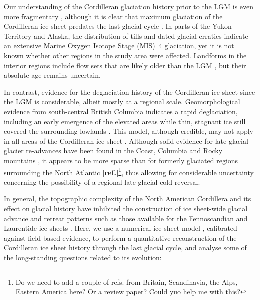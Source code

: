 \documentclass[tc, manuscript]{copernicus}
\newcommand{\aref}[0]{\textbf{[ref.]}}
\begin{document}
Our understanding of the Cordilleran glaciation history prior to the LGM is
even more fragmentary
    \citep{Barendregt.Irving.1998, Kleman.etal.2010, Rutter.etal.2012},
although it is clear that maximum glaciation of the Cordilleran ice sheet
predates the last glacial cycle
    \citep{Hidy.etal.2013}.
In parts of the Yukon Territory and Alaska, the distribution of tills
    \citep{Turner.etal.2013}
and dated glacial erratics
    \citep{Ward.etal.2007, Ward.etal.2008, Briner.Kaufman.2008,
           Stroeven.etal.2010, Stroeven.etal.2014}
indicate an extensive Marine Oxygen Isotope Stage (MIS)~4 glaciation,
yet it is not known whether other regions in the study area were affected.
Landforms in the interior regions include flow sets that are likely
older than the LGM
    \citep[Fig.~2]{Kleman.etal.2010},
but their absolute age remains uncertain.

In contrast, evidence for the deglaciation history of the Cordilleran
ice sheet since the LGM is considerable, albeit mostly at a regional scale.
Geomorphological evidence from south-central British Columbia indicates a rapid
deglaciation, including an early emergence of the elevated areas while thin,
stagnant ice still covered the surrounding lowlands
    \citep{Fulton.1967, Fulton.1991, Margold.etal.2011, Margold.etal.2013a}.
This model, although credible, may not apply in all areas of the Cordilleran
ice sheet
    \citep{Margold.etal.2013}.
Although solid evidence for late-glacial glacier re-advances have been found in
the Coast, Columbia and Rocky mountains
    \citep{Clague.etal.1997, Friele.Clague.2002, Friele.Clague.2002a,
           Kovanen.2002, Kovanen.Easterbrook.2002, Lakeman.etal.2008,
           Menounos.etal.2008},
it appears to be more sparse than for formerly glaciated regions surrounding
the North Atlantic \aref\footnote{
    Do we need to add a couple of refs. from Britain, Scandinavia, the Alps,
    Eastern America here? Or a review paper? Could yuo help me with this?},
thus allowing for considerable uncertainty concerning
the possibility of a regional late glacial cold reversal.

In general, the topographic complexity of the North American Cordillera and its
effect on glacial history have inhibited the construction of ice sheet-wide
glacial advance and retreat patterns such as
those available for the Fennoscandian and Laurentide ice sheets
     \citep{Boulton.etal.2001, Dyke.Prest.1987, Dyke.etal.2003,
            Kleman.etal.1997, Kleman.etal.2010}.
Here, we use a numerical ice sheet model \citep{PISM-authors.2014},
calibrated against field-based evidence, to perform a quantitative
reconstruction of the Cordilleran ice sheet history through the last glacial
cycle, and
analyse some of the long-standing questions related to its evolution:
\end{document}
